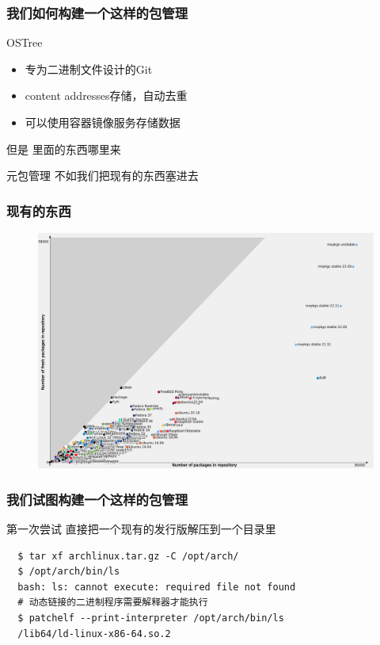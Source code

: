 \documentclass{ctexbeamer}
\begin{document}
\begin{frame}
  \frametitle{我们如何构建一个这样的包管理}
  \begin{exampleblock}{OSTree\footnotemark[2]}
    \begin{itemize}
      \item 专为二进制文件设计的Git
      \item content addresses存储，自动去重
      \item 可以使用容器镜像服务存储数据
    \end{itemize}
  \end{exampleblock}
  \begin{alertblock}{但是}
    里面的东西哪里来
  \end{alertblock}
  \begin{block}{元包管理}
    不如我们把现有的东西塞进去
  \end{block}
\end{frame}

\begin{frame}
  \frametitle{现有的东西}
  \begin{figure}
    \includegraphics[width=\linewidth]{./map_repo_size_fresh.pdf}
  \end{figure}
\end{frame}

\begin{frame}[fragile]
  \frametitle{我们试图构建一个这样的包管理}
  \begin{block}{第一次尝试}
    直接把一个现有的发行版解压到一个目录里
  \end{block}
  \begin{small}
  \begin{verbatim}
  $ tar xf archlinux.tar.gz -C /opt/arch/
  $ /opt/arch/bin/ls
  bash: ls: cannot execute: required file not found
  # 动态链接的二进制程序需要解释器才能执行
  $ patchelf --print-interpreter /opt/arch/bin/ls
  /lib64/ld-linux-x86-64.so.2
  \end{verbatim}
  \end{small}
\end{frame}
\end{document}
